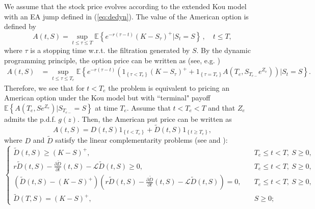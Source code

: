 \documentclass[11pt]{article}
\numberwithin{equation}{section}
\numberwithin{theorem}{section}
\begin{document}
We assume that the stock price evolves according to the extended Kou model with an EA jump defined in (\ref{eq:dedyn}). The value
of the American option is defined by
\begin{equation}
A\left(t,S\right)=\sup_{t\leq\tau\leq T}\mathbb{E}\left\{ e^{-r\left(\tau-t\right)}\left(K-S_{\tau}\right)^{+}\vert S_{t}=S\right\}\,,\quad t\leq T, \label{eq:am_def}
\end{equation}
where $\tau$ is a stopping time w.r.t. the filtration generated by $S$. By the dynamic programming principle, the option price can be written as (see, e.g. \citep[Chap. 10]{Oeksendal2003})
\begin{align}
A\left(t,S\right) & =\sup_{t\leq\tau\leq T_{e}}\mathbb{E}\left\{e^{-r\left(\tau-t\right)}\left( 1_{\left\{ \tau<T_{e}\right\} }\left(K-S_{\tau}\right)^{+}+1_{\left\{ \tau=T_{e}\right\} }A\left(T_{e},S_{T_{e-}}e^{Z_{e}}\right)\right)\vert S_{t}=S\right\} .\label{eq:Bellman}
\end{align}
Therefore, we see that for $t<T_e$ the problem is equivalent to pricing an American option under the Kou model but with ``terminal" payoff $\mathbb{E}\left\{A\left(T_{e},Se^{Z_{e}}\right)\vert S_{T_{e-}}=S\right\}$ at time $T_e$.  Assume that $t<T_e<T$ and 
that $Z_{e}$ admits the p.d.f. $g\left(z\right)$. Then, the American
put price can be written as
\[
A\left(t,S\right)=D\left(t,S\right)1_{\left\{ t<T_{e}\right\} }+\widetilde{D}\left(t,S\right)1_{\left\{ t\geq T_{e}\right\} },
\]
where $D$ and $\widetilde{D}$ satisfy the linear complementarity
problems (see  \citet{Bensoussan1984} and  \citet{Cont2005}):
\begin{equation}
\begin{cases}
\widetilde{D}\left(t,S\right)\geq\left(K-S\right)^{+}, & \quad   T_e \le t<T,\ S\geq0,\\
r\widetilde{D}\left(t,S\right)-\frac{\partial\widetilde{D}}{\partial t}\left(t,S\right)-\mathcal{L}\widetilde{D}\left(t,S\right)\geq0, & \quad   T_e \le t<T,\ S\geq0,\\
\left(\widetilde{D}\left(t,S\right)-\left(K-S\right)^{+}\right)\left(r\widetilde{D}\left(t,S\right)-\frac{\partial\widetilde{D}}{\partial t}\left(t,S\right)-\mathcal{L}\widetilde{D}\left(t,S\right)\right)=0, & \quad   T_e \le t<T,\ S\geq0,\\
\widetilde{D}\left(T,S\right)=\left(K-S\right)^{+}, & \quad S\geq0;
\end{cases}\label{eq:am_eq_1}
\end{equation}
\end{document}
